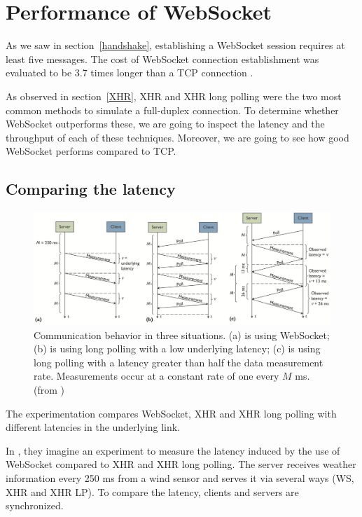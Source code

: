 \documentclass[10pt,journal,compsoc]{IEEEtran}
\newcommand{\ws}{WebSocket}
\begin{document}
\section{Performance of \ws{}}

As we saw in section~\ref{handshake}, establishing a \ws{} session requires at least five messages.
The cost of \ws{} connection establishment was evaluated to be 3.7 times longer than a TCP connection \cite{performanceEvaluationOfWebsocketProtocol}.  %

As observed in section~\ref{XHR}, XHR and XHR long polling were the two most common methods to simulate a full-duplex connection.
To determine whether \ws{} outperforms these, we are going to inspect the latency and the throughput of each of these techniques.
Moreover, we are going to see how good \ws{} performs compared to TCP. %

\subsection{Comparing the latency}

\begin{figure}[!t]
    \centering
    \includegraphics[width=\textwidth]{comdisp.png}
    \caption{Communication behavior in three situations. (a) is using \ws{}; (b) is using long polling with a low underlying latency; (c) is using long polling with a latency greater than half the data measurement rate. Measurements occur at a constant rate of one every $M$ ms. (from \cite{communicationAndDIsplayingRealTimeDataWithWebSocket})}
    \label{fig:comdisp}
\end{figure}

The experimentation compares \ws{}, XHR and XHR long polling with different latencies in the underlying link.

In \cite{communicationAndDIsplayingRealTimeDataWithWebSocket}, they imagine an experiment to measure the latency induced by the use of \ws{} compared to XHR and XHR long polling.
The server receives weather information every 250 ms from a wind sensor and serves it via several ways (WS, XHR and XHR LP).
To compare the latency, clients and servers are synchronized.
\end{document}
